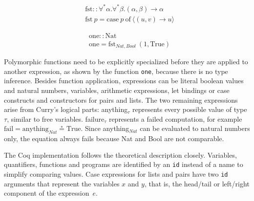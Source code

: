 \documentclass[fleqn, abstract=on]{scrreprt}
\newcommand{\coqinline}[1]{\texttt{#1}}
\begin{document}
\begin{figure}[H]
	\begin{minipage}{.5 \linewidth}
		\begin{align*}
		&\text{fst}::\forall^{*}\alpha.\forall^{*}\beta.(\alpha, \beta) \rightarrow\alpha\\
		&\text{fst}\: p = \text{case}\: p\: \text{of}\: \langle(u,v) \rightarrow u\rangle
		\end{align*}
	\end{minipage}
	\begin{minipage}{.5 \linewidth}
		\begin{align*}
		&\text{one} :: \text{Nat}\\
		&\text{one} = \text{fst}_{Nat, Bool} ~ (1, \text{True})
		\end{align*}
	\end{minipage}
\end{figure}\noindent
Polymorphic functions need to be explicitly specialized before they are applied to another expression, as shown by the function \texttt{one}, because there is no type inference.
Besides function application, expressions can be literal boolean values and natural numbers, variables, arithmetic expressions, let bindings or case constructs and constructors for pairs and lists. The two remaining expressions arise from Curry's logical parts: anything$_{\tau}$ represents every possible value of type $\tau$, similar to free variables. failure$_{\tau}$ represents a failed computation, for example $\text{fail} = \text{anything}_{Nat} \circeq \text{True}$. Since anything$_{Nat}$ can be evaluated to natural numbers only, the equation always fails because Nat and Bool are not comparable.
\par
The Coq implementation follows the theoretical description closely. Variables, quantifiers, functions and programs are identified by an \coqinline{id} instead of a name to simplify comparing values. Case expressions for lists and pairs have two \coqinline{id} arguments that represent the variables $x$ and $y$, that is, the head/tail or left/right component of the \mbox{expression $e$}.
\end{document}
